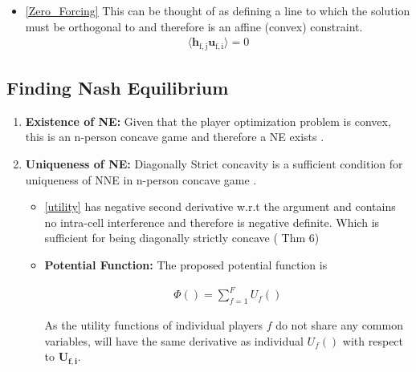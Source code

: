 \documentclass[12pt]{article}
\begin{document}
\begin{enumerate}
\begin{itemize}
\item\eqref{Zero_Forcing} 
This can be thought of as defining a line to which the solution must be orthogonal to and therefore is an affine (convex) constraint. 
\begin{gather}
\langle \mathbf{h_{\mathrm{f,j}}}\mathbf{u_{\mathrm{f,i}}} \rangle =0
\end{gather}

\end{itemize}
\end{enumerate}

\subsection{Finding Nash Equilibrium}

\begin{enumerate}
\item \textbf{Existence of NE:} Given that the player optimization problem is convex, this is an n-person concave game and therefore a NE exists \cite{rosen1964existence}. 
\item \textbf{Uniqueness of NE:} Diagonally Strict concavity is a sufficient condition for uniqueness of NNE in n-person concave game \cite{rosen1964existence}.
\begin{itemize}
\item\eqref{utility} has negative second derivative w.r.t the argument and contains no intra-cell interference and therefore is negative definite. Which is sufficient for being diagonally strictly concave
\cite[Thm6]{rosen1964existence} ( Thm 6)

\item \textbf{Potential Function:} The proposed potential function is 

\begin{gather*} \label{Potential_Function}
\Phi() = \sum_{f = 1}^{F} U_f() 
\end{gather*}


As the utility functions of individual players $f$ do not share any common variables,  \label{Potential_Function} will have the same derivative as individual $U_f()$ with respect to $\mathbf{U_{f,i}} $. 


\end{itemize}

\end{enumerate}
\end{document}
